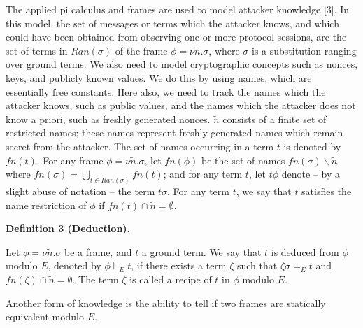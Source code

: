 \documentclass[10pt,a4paper]{amsart}
\begin{document}
 
The applied pi calculus and frames are used to model attacker knowledge [3]. In this model, the set of messages or terms which the attacker knows, and which could have been obtained from observing one or more protocol sessions, are the set of terms in $Ran(\sigma)$ of the frame $\phi=\nu\tilde{n}.\sigma$, where $\sigma$ is a substitution ranging over ground terms. We also need to model cryptographic concepts such as nonces, keys, and publicly known values. We do this by using names, which are essentially free constants. Here also, we need to track the names which the attacker knows, such as public values, and the names which the attacker does not know a priori, such as freshly generated nonces. $\tilde{n}$ consists of a finite set of restricted names; these names represent freshly generated names which remain secret from the attacker. The set of names occurring in a term $t$ is denoted by $\mathit{fn}(t)$. For any frame $\phi=\nu\tilde{n}.\sigma$, let $\mathit{fn}(\phi)$ be the set of names $\mathit{fn}(\sigma)\backslash\tilde{n}$ where $\mathit{fn}(\sigma)=\bigcup_{t\in Ran(\sigma)}\mathit{fn}(t)$; and for any term $t$, let $t\phi$ denote – by a slight abuse of notation – the term $t\sigma$. For any term $t$, we say that $t$ satisfies the name restriction of $\phi$ if $\mathit{fn}(t)\cap\tilde{n}=\emptyset$.\par
 
 
 
\par\medskip\noindent\textbf{Definition 3 (Deduction).}\par
 
 
Let $\phi=\nu\tilde{n}.\sigma$ be a frame, and $t$ a ground term. We say that $t$ is deduced from $\phi$ modulo $E$, denoted by $\phi\vdash_{E}t$, if there exists a term $\zeta$ such that $\zeta\sigma=_{E}t$ and $\mathit{fn}(\zeta)\cap\tilde{n}=\emptyset$. The term $\zeta$ is called a recipe of $t$ in $\phi$ modulo $E$.\par
 
 
 
 
Another form of knowledge is the ability to tell if two frames are statically equivalent modulo $E$.\par
 
\end{document}
